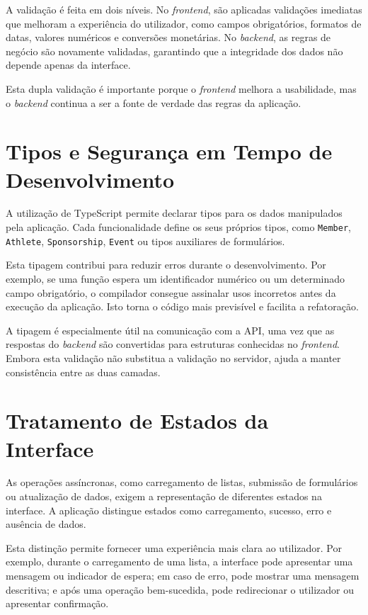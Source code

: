 A validação é feita em dois níveis. No \textit{frontend}, são aplicadas
validações imediatas que melhoram a experiência do utilizador, como campos
obrigatórios, formatos de datas, valores numéricos e conversões monetárias. No
\textit{backend}, as regras de negócio são novamente validadas, garantindo que
a integridade dos dados não depende apenas da interface.

Esta dupla validação é importante porque o \textit{frontend} melhora a
usabilidade, mas o \textit{backend} continua a ser a fonte de verdade das
regras da aplicação.

\section{Tipos e Segurança em Tempo de Desenvolvimento}

A utilização de TypeScript permite declarar tipos para os dados manipulados
pela aplicação. Cada funcionalidade define os seus próprios tipos, como
\texttt{Member}, \texttt{Athlete}, \texttt{Sponsorship}, \texttt{Event} ou
tipos auxiliares de formulários.

Esta tipagem contribui para reduzir erros durante o desenvolvimento. Por
exemplo, se uma função espera um identificador numérico ou um determinado
campo obrigatório, o compilador consegue assinalar usos incorretos antes da
execução da aplicação. Isto torna o código mais previsível e facilita a
refatoração.

A tipagem é especialmente útil na comunicação com a API, uma vez que as
respostas do \textit{backend} são convertidas para estruturas conhecidas no
\textit{frontend}. Embora esta validação não substitua a validação no servidor,
ajuda a manter consistência entre as duas camadas.

\section{Tratamento de Estados da Interface}

As operações assíncronas, como carregamento de listas, submissão de formulários
ou atualização de dados, exigem a representação de diferentes estados na
interface. A aplicação distingue estados como carregamento, sucesso, erro e
ausência de dados.

Esta distinção permite fornecer uma experiência mais clara ao utilizador. Por
exemplo, durante o carregamento de uma lista, a interface pode apresentar uma
mensagem ou indicador de espera; em caso de erro, pode mostrar uma mensagem
descritiva; e após uma operação bem-sucedida, pode redirecionar o utilizador ou
apresentar confirmação.

